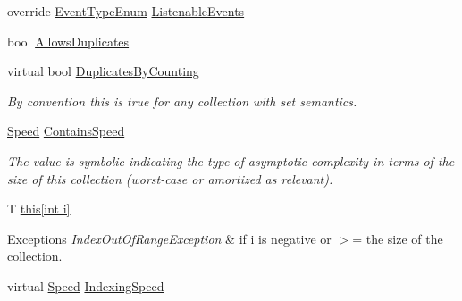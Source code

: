 \begin{DoxyCompactItemize}
\item 
override \hyperlink{namespace_c5_a9143bfd561fffa025d21561674758008}{Event\+Type\+Enum} \hyperlink{class_c5_1_1_tree_bag_a51345f4ffe46dd62758f63ff084f3062}{Listenable\+Events}
\item 
bool \hyperlink{class_c5_1_1_tree_bag_accec3077233cff8a029dc3b4acc4dcd6}{Allows\+Duplicates}
\item 
virtual bool \hyperlink{class_c5_1_1_tree_bag_ab30340e576e1bb284ffcb161b54ba5c7}{Duplicates\+By\+Counting}
\begin{DoxyCompactList}\small\item\em By convention this is true for any collection with set semantics. \end{DoxyCompactList}\item 
\hyperlink{namespace_c5_a615ba88dcdaa8d5a3c5f833a73d7fad6}{Speed} \hyperlink{class_c5_1_1_tree_bag_abb9302b90eec04c6eaca70c7cfeed117}{Contains\+Speed}
\begin{DoxyCompactList}\small\item\em The value is symbolic indicating the type of asymptotic complexity in terms of the size of this collection (worst-\/case or amortized as relevant). \end{DoxyCompactList}\item 
T \hyperlink{class_c5_1_1_tree_bag_a912d39c72ddaee09533750ce5a978461}{this\mbox{[}int i\mbox{]}}
\begin{DoxyCompactList}\small\item\em 
\begin{DoxyExceptions}{Exceptions}
{\em Index\+Out\+Of\+Range\+Exception} & if i is negative or $>$= the size of the collection. \\
\hline
\end{DoxyExceptions}
\end{DoxyCompactList}\item 
virtual \hyperlink{namespace_c5_a615ba88dcdaa8d5a3c5f833a73d7fad6}{Speed} \hyperlink{class_c5_1_1_tree_bag_aeae7ae92a52a654311d76ccadaaa0d4d}{Indexing\+Speed}

\end{DoxyCompactItemize}
